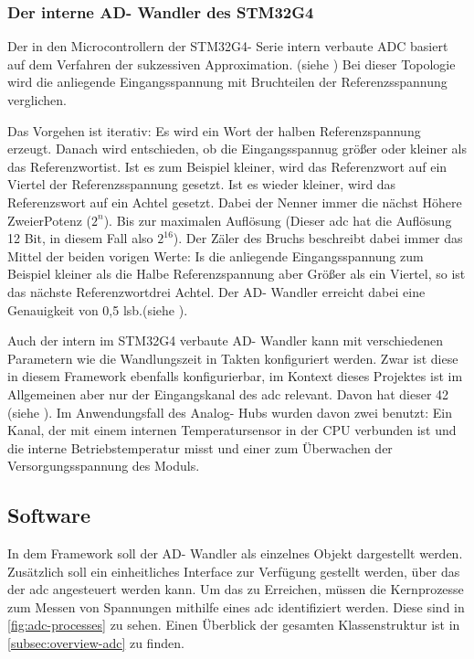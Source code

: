 \subsubsection{Der interne AD- Wandler des STM32G4}
\label{subsubsec:internal-adc}
Der in den Microcontrollern der STM32G4- Serie intern verbaute ADC basiert auf dem Verfahren der sukzessiven Approximation. (siehe \textcite[][3]{AN5346})
Bei dieser Topologie wird die anliegende Eingangsspannung mit Bruchteilen der Referenzsspannung verglichen.

Das Vorgehen ist iterativ: Es wird ein Wort der halben Referenzspannung erzeugt.
Danach wird entschieden, ob die Eingangsspannug größer oder kleiner als das \glqq Referenzwort\grqq ist.
Ist es zum Beispiel kleiner, wird das Referenzwort auf ein Viertel der Referenzsspannung gesetzt.
Ist es wieder kleiner, wird das Referenzswort auf ein Achtel gesetzt. Dabei der Nenner immer die nächst Höhere ZweierPotenz ($2^{n}$). Bis zur maximalen Auflösung (Dieser \ac{adc} hat die Auflösung 12 Bit, in diesem Fall also $2^{16}$).\newline
Der Zäler des Bruchs beschreibt dabei immer das Mittel der beiden vorigen Werte: Is die anliegende Eingangsspannung zum Beispiel kleiner als die Halbe Referenzspannung aber Größer als ein Viertel, so ist das nächste \glqq Referenzwort\grqq drei Achtel.
Der AD- Wandler erreicht dabei eine Genauigkeit von 0,5 \ac{lsb}.(siehe \textcite[][3]{AN5346}).

Auch der intern im STM32G4 verbaute AD- Wandler kann mit verschiedenen Parametern wie die Wandlungszeit in Takten konfiguriert werden.\newline
Zwar ist diese in diesem Framework ebenfalls konfigurierbar, im Kontext dieses Projektes ist im Allgemeinen aber nur der Eingangskanal des \ac{adc} relevant.
Davon hat dieser 42 (siehe \textcite[][2]{AN5346}).
Im Anwendungsfall des Analog- Hubs wurden davon zwei benutzt:
Ein Kanal, der mit einem internen Temperatursensor in der CPU verbunden ist und die interne Betriebstemperatur misst und einer zum Überwachen der Versorgungsspannung des Moduls.


\subsection{Software}
\label{subsec:hardware}
In dem Framework soll der AD- Wandler als einzelnes Objekt dargestellt werden.
Zusätzlich soll ein einheitliches Interface zur Verfügung gestellt werden, über das der \ac{adc} angesteuert werden kann.
Um das zu Erreichen, müssen die Kernprozesse zum Messen von Spannungen mithilfe eines \ac{adc} identifiziert werden.
Diese sind in \autoref{fig:adc-processes} zu sehen.
Einen Überblick der gesamten Klassenstruktur ist in \autoref{subsec:overview-adc} zu finden.

